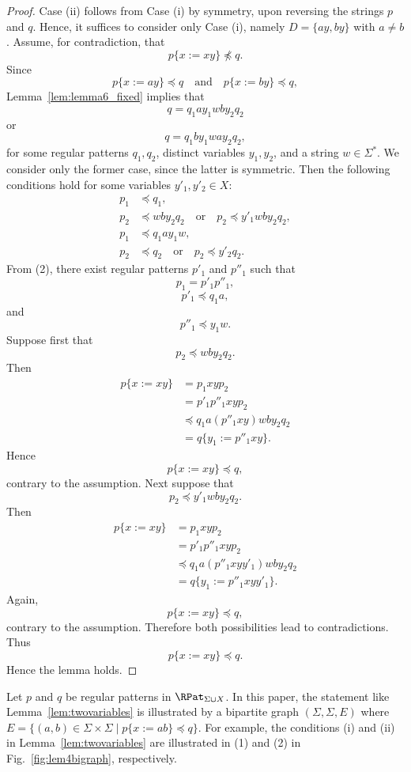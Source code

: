 \begin{proof}
{Case (ii) follows from Case (i) by symmetry, upon reversing the strings $p$ and $q$. Hence, it suffices to consider only Case (i), namely $D=\{ay,by\}$ with $a\neq b$. Assume, for contradiction, that \[ p\{x:=xy\}\not\preceq q. \] Since \[ p\{x:=ay\}\preceq q \quad\text{and}\quad p\{x:=by\}\preceq q, \] Lemma~\ref{lem:lemma6_fixed} implies that \[ q=q_1ay_1wby_2q_2 \] or \[ q=q_1by_1way_2q_2, \] for some regular patterns $q_1,q_2$, distinct variables $y_1,y_2$, and a string $w\in\Sigma^*$. We consider only the former case, since the latter is symmetric. Then the following conditions hold for some variables $y'_1,y'_2\in X$: \begin{align} p_1 &\preceq q_1, \tag{1}\\ p_2 &\preceq wby_2q_2 \quad\text{or}\quad p_2\preceq y'_1wby_2q_2, \tag{1'}\\ p_1 &\preceq q_1ay_1w, \tag{2}\\ p_2 &\preceq q_2 \quad\text{or}\quad p_2\preceq y'_2q_2. \tag{2'} \end{align} From (2), there exist regular patterns $p'_1$ and $p''_1$ such that \[ p_1=p'_1p''_1, \] \[ p'_1\preceq q_1a, \] and \[ p''_1\preceq y_1w. \] Suppose first that \[ p_2\preceq wby_2q_2. \] Then \[ \begin{aligned} p\{x:=xy\} &= p_1xyp_2 \\ &= p'_1p''_1xyp_2 \\ &\preceq q_1a(p''_1xy)wby_2q_2 \\ &= q\{y_1:=p''_1xy\}. \end{aligned} \] Hence \[ p\{x:=xy\}\preceq q, \] contrary to the assumption. Next suppose that \[ p_2\preceq y'_1wby_2q_2. \] Then \[ \begin{aligned} p\{x:=xy\} &= p_1xyp_2 \\ &= p'_1p''_1xyp_2 \\ &\preceq q_1a(p''_1xyy'_1)wby_2q_2 \\ &= q\{y_1:=p''_1xyy'_1\}. \end{aligned} \] Again, \[ p\{x:=xy\}\preceq q, \] contrary to the assumption. Therefore both possibilities lead to contradictions. Thus \[ p\{x:=xy\}\preceq q. \] Hence the lemma holds.}
\end{proof}



Let $p$ and $q$ be regular patterns in {\color{black}$\RPat_{\Sigma\cup X}$}.
In this paper, the statement like Lemma~\ref{lem:twovariables} is illustrated by a bipartite graph $(\Sigma, \Sigma, E)$ where $E = \{(a, b) \in \Sigma\times\Sigma \mid p\{x:=ab\} \preceq q\}$.
For example, the conditions (i) and (ii) in Lemma~\ref{lem:twovariables} are illustrated in (1) and (2) in Fig.~\ref{fig:lem4bigraph}, respectively.

